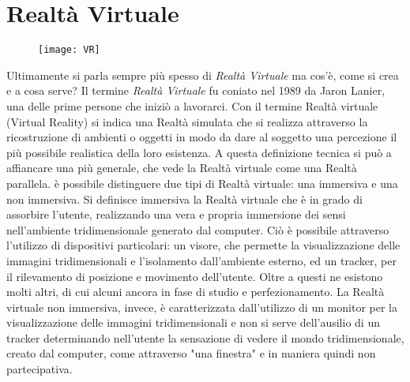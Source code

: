 \chapter{Realtà Virtuale}
\label{VR}

 \begin{figure}[htb]
    \centering
    \texttt{[image: VR]}
\end{figure}
\noindent Ultimamente si parla sempre più spesso di \textit{Realtà Virtuale} ma cos'è, come si crea e a cosa serve?
Il termine \textit{Realtà Virtuale} fu coniato nel 1989 da Jaron Lanier, una delle prime persone che iniziò a lavorarci. Con il termine Realtà virtuale (Virtual Reality) si indica una Realtà simulata che si realizza attraverso la ricostruzione di ambienti o oggetti in modo da dare al soggetto una percezione il più possibile realistica della loro esistenza. A questa definizione tecnica si può a affiancare una più generale, che vede la Realtà virtuale come una Realtà parallela. è possibile distinguere due tipi di Realtà virtuale: una immersiva e una non immersiva. Si definisce immersiva la Realtà virtuale che è in grado di assorbire l'utente, realizzando una vera e propria immersione dei sensi nell'ambiente tridimensionale generato dal computer. Ciò è possibile attraverso l'utilizzo di dispositivi particolari: un visore, che permette la visualizzazione delle immagini tridimensionali e l'isolamento dall'ambiente esterno, ed un tracker, per il rilevamento di posizione e movimento dell'utente. Oltre a questi ne esistono molti altri, di cui alcuni ancora in fase di studio e perfezionamento. La Realtà virtuale non immersiva, invece, è caratterizzata dall'utilizzo di un monitor per la visualizzazione delle immagini tridimensionali e non si serve dell'ausilio di un tracker determinando nell'utente la sensazione di vedere il mondo tridimensionale, creato dal computer, come attraverso "una finestra" e in maniera quindi non partecipativa.
